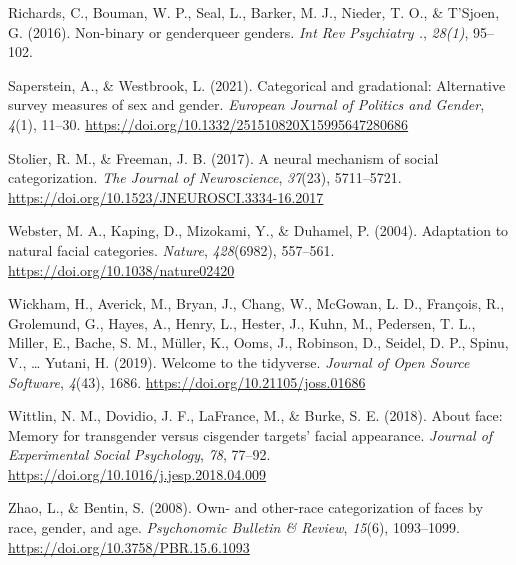 \documentclass[
  man]{apa7}
\newlength{\cslhangindent}
\newlength{\cslentryspacingunit} %
\newenvironment{CSLReferences}[2] %
 {%
  \setlength{\parindent}{0pt}
  \ifodd #1
  \let\oldpar\par
  \def\par{\hangindent=\cslhangindent\oldpar}
  \fi
  \setlength{\parskip}{#2\cslentryspacingunit}
 }%
 {}
\begin{document}
\begin{CSLReferences}{1}{0}
\leavevmode{}%
Richards, C., Bouman, W. P., Seal, L., Barker, M. J., Nieder, T. O., \& T'Sjoen, G. (2016). Non-binary or genderqueer genders. \emph{Int Rev Psychiatry .}, \emph{28(1)}, 95--102.

\leavevmode{}%
Saperstein, A., \& Westbrook, L. (2021). Categorical and gradational: Alternative survey measures of sex and gender. \emph{European Journal of Politics and Gender}, \emph{4}(1), 11--30. \url{https://doi.org/10.1332/251510820X15995647280686}

\leavevmode{}%
Stolier, R. M., \& Freeman, J. B. (2017). A neural mechanism of social categorization. \emph{The Journal of Neuroscience}, \emph{37}(23), 5711--5721. \url{https://doi.org/10.1523/JNEUROSCI.3334-16.2017}

\leavevmode{}%
Webster, M. A., Kaping, D., Mizokami, Y., \& Duhamel, P. (2004). Adaptation to natural facial categories. \emph{Nature}, \emph{428}(6982), 557--561. \url{https://doi.org/10.1038/nature02420}

\leavevmode{}%
Wickham, H., Averick, M., Bryan, J., Chang, W., McGowan, L. D., François, R., Grolemund, G., Hayes, A., Henry, L., Hester, J., Kuhn, M., Pedersen, T. L., Miller, E., Bache, S. M., Müller, K., Ooms, J., Robinson, D., Seidel, D. P., Spinu, V., \ldots{} Yutani, H. (2019). Welcome to the {tidyverse}. \emph{Journal of Open Source Software}, \emph{4}(43), 1686. \url{https://doi.org/10.21105/joss.01686}

\leavevmode{}%
Wittlin, N. M., Dovidio, J. F., LaFrance, M., \& Burke, S. E. (2018). About face: Memory for transgender versus cisgender targets' facial appearance. \emph{Journal of Experimental Social Psychology}, \emph{78}, 77--92. \url{https://doi.org/10.1016/j.jesp.2018.04.009}

\leavevmode{}%
Zhao, L., \& Bentin, S. (2008). Own- and other-race categorization of faces by race, gender, and age. \emph{Psychonomic Bulletin \& Review}, \emph{15}(6), 1093--1099. \url{https://doi.org/10.3758/PBR.15.6.1093}

\end{CSLReferences}
\end{document}
